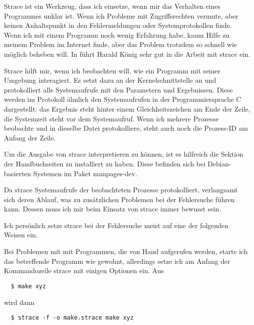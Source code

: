 \begin{normaltext}
  Strace ist ein Werkzeug, dass ich einsetze, wenn mir das Verhalten eines
  Programmes unklar ist. Wenn ich Probleme mit Zugriffsrechten vermute, aber
  keinen Anhaltspunkt in den Fehlermeldungen oder Systemprotokollen finde.
  Wenn ich mit einem Programm noch wenig Erfahrung habe, kaum Hilfe zu meinem
  Problem im Internet finde, aber das Problem trotzdem so schnell wie möglich
  beheben will.
  In \cite{guug:uptimes:2012.1/07} führt Harald König sehr gut in die Arbeit
  mit strace ein.
  
  Strace hilft mir, wenn ich beobachten will, wie ein Programm
  mit seiner Umgebung interagiert. Es setzt dazu an der Kernelschnittstelle
  an und protokolliert alle Systemaufrufe mit den Parametern und Ergebnissen.
  Diese werden im Protokoll ähnlich den Systemaufrufen in der
  Programmiersprache C dargestellt: das Ergebnis steht hinter einem
  Gleichheitszeichen am Ende der Zeile, die Systemzeit steht vor dem
  Systemaufruf. Wenn ich mehrere Prozesse beobachte und in dieselbe Datei
  protokolliere, steht auch noch die Prozess-ID am Anfang der Zeile.

  Um die Ausgabe von strace interpretieren zu können, ist es hilfreich die
  Sektion der Handbuchseiten zu installiert zu haben. Diese befinden sich bei
  Debian-basierten Systemen im Paket manpages-dev.

  Da strace Systemaufrufe der beobachteten Prozesse protokolliert, verlangsamt
  sich deren Ablauf, was zu zusätzlichen Problemen bei der Fehlersuche führen
  kann. Dessen muss ich mir beim Einsatz von strace immer bewusst sein.

  Ich persönlich setze strace bei der Fehlersuche meist auf eine der folgenden
  Weisen ein.

  Bei Problemen mit mit Programmen, die von Hand aufgerufen werden, starte ich
  das betreffende Programm wie gewohnt, allerdings setze ich am Anfang der
  Kommandozeile strace mit einigen Optionen ein. Aus

  \begin{verbatim}
  $ make xyz
  \end{verbatim}

  wird dann

  \begin{verbatim}
  $ strace -f -o make.strace make xyz
  \end{verbatim}


\end{normaltext}
